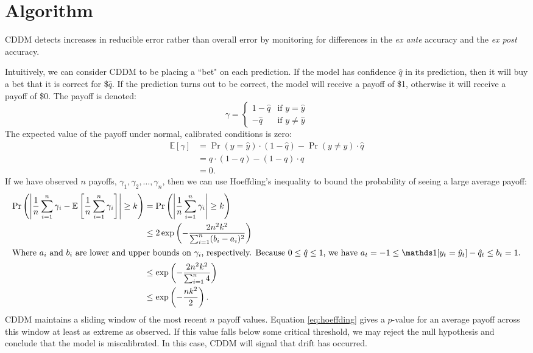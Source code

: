 
\section{Algorithm} \label{CDDM:algorithm}

CDDM detects increases in reducible error rather than overall error by monitoring for differences in the {\it ex ante} accuracy and the {\it ex post} accuracy. 

Intuitively, we can consider CDDM to be placing a ``bet" on each prediction. If the model has confidence $\hat{q}$ in its prediction, then it will buy a bet that it is correct for \$$\hat{q}$. If the prediction turns out to be correct, the model will receive a payoff of \$1, otherwise it will receive a payoff of \$0. The payoff is denoted:
\begin{equation}
    \gamma = \begin{cases} 
        1-\hat{q} & \text{if }y=\hat{y} \\ 
        -\hat{q} & \text{if }y\ne\hat{y}
    \end{cases}
\end{equation}
The expected value of the payoff under normal, calibrated conditions is zero:
\begin{align}
	\mathbb{E}[\gamma] &= \Pr(y=\hat{y}) \cdot (1-\hat{q}) - \Pr(y\ne \hat{y}) \cdot \hat{q} \\
	&= q \cdot (1-q) - (1-q) \cdot q \\
	&= 0. \label{eq:expectation}
\end{align}
If we have observed $n$ payoffs, $\gamma_1,\gamma_2,\dots,\gamma_n$, then we can use Hoeffding's inequality \cite{hoeffding} to bound the probability of seeing a large average payoff:
\begin{align}
    \Pr\left(  \left| \frac{1}{n} \sum_{i=1}^n \gamma_i - \mathbb{E}\left[\frac{1}{n} \sum_{i=1}^n \gamma_i\right] \right| \ge k \right)
    &= \Pr\left(  \left| \frac{1}{n} \sum_{i=1}^n \gamma_i \right| \ge k \right) \\
    &\le 2 \exp\left(-\frac{2n^2k^2}{\sum_{i=1}^n(b_i - a_i)^2}\right) \\
    \intertext{Where $a_i$ and $b_i$ are lower and upper bounds on $\gamma_i$, respectively. Because $0\le \hat{q} \le 1$, we have $a_t=-1 \le \id{y_t=\hat{y}_t} - \hat{q}_t \le b_t=1$.}
  &\le \exp\left(-\frac{2n^2k^2}{\sum_{i=1}^n 4}\right) \\
  &\le \exp\left(-\frac{nk^2}{2}\right). \label{eq:hoeffding}
\end{align}
CDDM maintains a sliding window of the most recent $n$ payoff values. Equation \ref{eq:hoeffding} gives a $p$-value for an average payoff across this window at least as extreme as observed. If this value falls below some critical threshold, we may reject the null hypothesis and conclude that the model is miscalibrated. In this case, CDDM will signal that drift has occurred.

